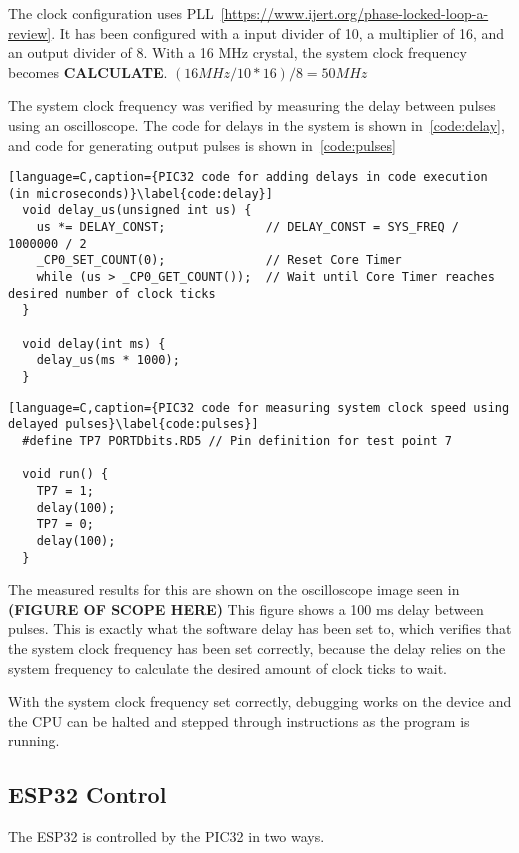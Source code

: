 The clock configuration uses PLL~\ref{https://www.ijert.org/phase-locked-loop-a-review}.
It has been configured with a input divider of 10, a multiplier of 16, and an output divider of 8.
With a 16 MHz crystal, the system clock frequency becomes \textbf{CALCULATE}.
\((16 MHz / 10 * 16) / 8 = 50 MHz\)

The system clock frequency was verified by measuring the delay between pulses using an oscilloscope.
The code for delays in the system is shown in~\autoref{code:delay}, and code for generating output pulses is shown in~\autoref{code:pulses}

\begin{lstlisting}[language=C,caption={PIC32 code for adding delays in code execution (in microseconds)}\label{code:delay}]
  void delay_us(unsigned int us) {
    us *= DELAY_CONST;              // DELAY_CONST = SYS_FREQ / 1000000 / 2
    _CP0_SET_COUNT(0);              // Reset Core Timer
    while (us > _CP0_GET_COUNT());  // Wait until Core Timer reaches desired number of clock ticks
  }

  void delay(int ms) {
    delay_us(ms * 1000);
  }
\end{lstlisting}

\begin{lstlisting}[language=C,caption={PIC32 code for measuring system clock speed using delayed pulses}\label{code:pulses}]
  #define TP7 PORTDbits.RD5 // Pin definition for test point 7

  void run() {
    TP7 = 1;
    delay(100);
    TP7 = 0;
    delay(100);
  }
\end{lstlisting}

The measured results for this are shown on the oscilloscope image seen in \textbf{(FIGURE OF SCOPE HERE)}
This figure shows a 100 ms delay between pulses.
This is exactly what the software delay has been set to, which verifies that the system clock frequency has been set correctly,
because the delay relies on the system frequency to calculate the desired amount of clock ticks to wait.

With the system clock frequency set correctly, debugging works on the device and the CPU can be halted and stepped through instructions as the program is running.

\subsection{ESP32 Control}
The ESP32 is controlled by the PIC32 in two ways.

